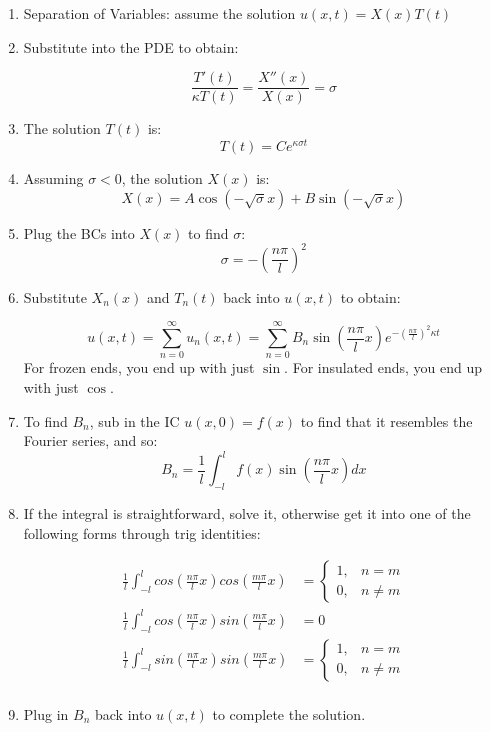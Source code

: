 \documentclass[11pt]{article}
\begin{document}
\begin{enumerate}

\item Separation of Variables: assume the solution $u(x,t) = X(x)T(t)$
\item Substitute into the PDE to obtain:

$$ \frac{T'(t)}{\kappa T(t)} = \frac{X''(x)}{X(x)} = \sigma $$

\item The solution $T(t)$ is:
$$ T(t) = Ce^{\kappa \sigma t}$$

\item Assuming $\sigma < 0$, the solution $X(x)$ is:
$$ X(x) = A\cos(-\sqrt{\sigma}x) + B\sin(-\sqrt{\sigma}x) $$

\item Plug the BCs into $X(x)$ to find $\sigma$:
$$ \sigma = -(\frac{n\pi}{l})^2 $$
\item Substitute $X_n(x)$ and $T_n(t)$ back into $u(x,t)$ to obtain:

$$ u(x,t) = \sum \limits_{n=0}^{\infty} u_n(x,t) = \sum \limits_{n=0}^{\infty} B_n \sin(\frac{n\pi}{l}x)e^{-(\frac{n\pi}{l})^2\kappa t}$$
For frozen ends, you end up with just $\sin$. For insulated ends, you end up with just $\cos$.

\item To find $B_n$, sub in the IC $u(x,0)=f(x)$ to find that it resembles the Fourier series, and so:
$$ B_n = \frac{1}{l} \int_{-l}^{l} f(x) \sin(\frac{n\pi}{l}x) dx$$

\item If the integral is straightforward, solve it, otherwise get it into one of the following forms through trig identities:

\begin{align*}
	\frac{1}{l} \int_{-l}^{l} cos(\frac{n\pi}{l}x)cos(\frac{m\pi}{l}x) &= 
		\begin{cases}
			1, & n=m \\
			0, & n\neq m
		\end{cases}\\
\frac{1}{l} \int_{-l}^{l} cos(\frac{n\pi}{l}x)sin(\frac{m\pi}{l}x) &= 0 \\
\frac{1}{l} \int_{-l}^{l} sin(\frac{n\pi}{l}x)sin(\frac{m\pi}{l}x) &= 
		\begin{cases}
			1, & n=m \\
			0, & n\neq m
		\end{cases}\\
\end{align*}

\item Plug in $B_n$ back into $u(x,t)$ to complete the solution.

\end{enumerate}
\end{document}
